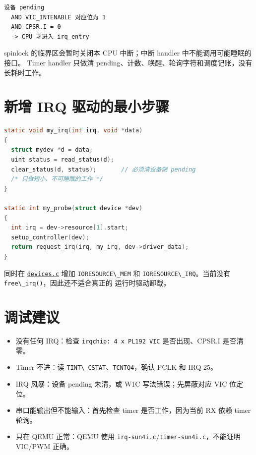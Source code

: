 \begin{lstlisting}
设备 pending
  AND VIC_INTENABLE 对应位为 1
  AND CPSR.I = 0
  -> CPU 才进入 irq_entry
\end{lstlisting}

spinlock 的临界区会暂时关闭本 CPU 中断；中断 handler
中不能调用可能睡眠的接口。 Timer handler 只做清
pending、计数、唤醒、轮询字符和调度记账，没有长耗时工作。

\section{新增 IRQ
驱动的最小步骤}\label{ux65b0ux589e-irq-ux9a71ux52a8ux7684ux6700ux5c0fux6b65ux9aa4}

\begin{lstlisting}[language=C]
static void my_irq(int irq, void *data)
{
  struct mydev *d = data;
  uint status = read_status(d);
  clear_status(d, status);       // 必须清设备侧 pending
  /* 只做短小、不可睡眠的工作 */
}

static int my_probe(struct device *dev)
{
  int irq = dev->resource[1].start;
  setup_controller(dev);
  return request_irq(irq, my_irq, dev->driver_data);
}
\end{lstlisting}

同时在
\href{../../../kernel/arch/arm/mach-s5pv210/devices.c}{\passthrough{\lstinline!devices.c!}}
增加 \passthrough{\lstinline!IORESOURCE\_MEM!} 和
\passthrough{\lstinline!IORESOURCE\_IRQ!}。当前没有
\passthrough{\lstinline!free\_irq()!}，因此还不适合真正的
运行时驱动卸载。

\section{调试建议}\label{ux8c03ux8bd5ux5efaux8bae}

\begin{itemize}
\tightlist
\item
  没有任何 IRQ：检查 \passthrough{\lstinline!irqchip: 4 x PL192 VIC!}
  是否出现、CPSR.I 是否清零。
\item
  Timer 不进：读
  \passthrough{\lstinline!TINT\_CSTAT!}、\passthrough{\lstinline!TCNTO4!}，确认
  PCLK 和 IRQ 25。
\item
  IRQ 风暴：设备 pending 未清，或 W1C 写法错误；先屏蔽对应 VIC 位定位。
\item
  串口能输出但不能输入：首先检查 timer 是否工作，因为当前 RX 依赖 timer
  轮询。
\item
  只在 QEMU 正常：QEMU 使用
  \passthrough{\lstinline!irq-sun4i.c!}/\passthrough{\lstinline!timer-sun4i.c!}，不能证明
  VIC/PWM 正确。
\end{itemize}
